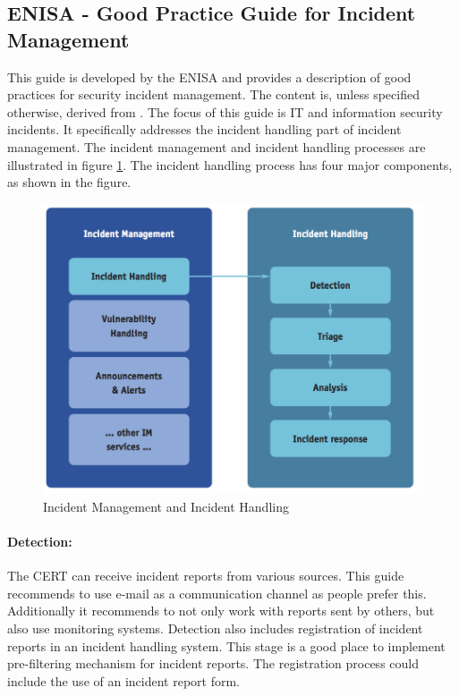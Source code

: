 \subsection{\acs{ENISA} - Good Practice Guide for Incident Management}
This guide is developed by the \ac{ENISA} and provides a description of good practices for security incident management. The content is, unless specified otherwise, derived from \cite{enisaGuide}. The focus of this guide is IT and information security incidents. It specifically addresses the incident handling part of incident management. The incident management and incident handling processes are illustrated in figure \ref{fig:ENISAIncidentManagement}. The incident handling process has four major components, as shown in the figure. 

\begin{figure}[h]
\begin{center}
\includegraphics[scale=0.68]{enisaIncidentManagement.png}
\caption[ENISA Incident Management and Incident Handling]{Incident Management and Incident Handling \cite{enisaGuide}}
\label{fig:ENISAIncidentManagement}
\end{center}
\end{figure}

\paragraph{Detection:} The \ac{CERT} can receive incident reports from various sources. This guide recommends to use e-mail as a communication channel as people prefer this. Additionally it recommends to not only work with reports sent by others, but also use monitoring systems. Detection also includes registration of incident reports in an incident handling system. This stage is a good place to implement pre-filtering mechanism for incident reports. The registration process could include the use of an incident report form.

